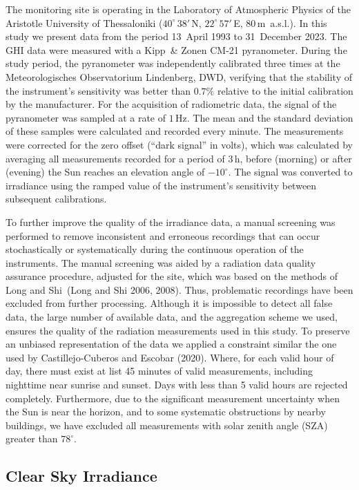 \documentclass[
]{article}
\begin{document}
The monitoring site is operating in the Laboratory of Atmospheric Physics of the
Aristotle University of Thessaloniki (\(40^\circ\,38'\,\)N,
\(22^\circ\,57'\,\)E, \(80\,\)m~a.s.l.).
In this study we present data from the period
13~April 1993 to
31~December 2023.
The GHI data were measured with a Kipp~\& Zonen CM-21 pyranometer. During the study
period, the pyranometer was independently calibrated three times at the
Meteorologisches Observatorium Lindenberg, DWD, verifying that the stability of the
instrument's sensitivity was better than \(0.7\%\) relative to the initial calibration
by the manufacturer.
For the acquisition of radiometric data, the signal of the pyranometer was sampled at
a rate of \(1\,\text{Hz}\). The mean and the standard deviation of these samples were
calculated and recorded every minute. The measurements were corrected for the zero
offset (``dark signal'' in volts), which was calculated by averaging all measurements
recorded for a period of \(3\,\text{h}\), before (morning) or after (evening) the Sun
reaches an elevation angle of \(-10^\circ\). The signal was converted to irradiance
using the ramped value of the instrument's sensitivity between subsequent
calibrations.

To further improve the quality of the irradiance data, a manual screening was
performed to remove inconsistent and erroneous recordings that can occur
stochastically or systematically during the continuous operation of the instruments.
The manual screening was aided by a radiation data quality assurance procedure,
adjusted for the site, which was based on the methods of Long and Shi~(Long and Shi 2006, 2008). Thus, problematic recordings have been excluded from further
processing. Although it is impossible to detect all false data, the large number of
available data, and the aggregation scheme we used, ensures the quality of the
radiation measurements used in this study.
To preserve an unbiased representation of the data we applied a constraint similar
the one used by Castillejo-Cuberos and Escobar (2020). Where, for each valid hour of day, there
must exist at list 45 minutes of valid measurements, including nighttime near
sunrise and sunset. Days with less than 5 valid hours are rejected completely.
Furthermore, due to the significant measurement uncertainty when the Sun is near the
horizon, and to some systematic obstructions by nearby buildings, we have excluded
all measurements with solar zenith angle (SZA) greater than \(78^\circ\).

\hypertarget{clear-sky-irradiance}{%
\subsection{Clear Sky Irradiance}\label{clear-sky-irradiance}}
\end{document}
